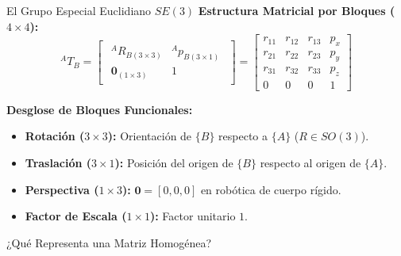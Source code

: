\documentclass[aspectratio=169]{beamer}
\begin{document}
\begin{frame}{El Grupo Especial Euclidiano $SE(3)$}
    \textbf{Estructura Matricial por Bloques ($4 \times 4$):}
    \begin{equation*}
        ^{A}T_B = \begin{bmatrix} 
        \begin{array}{c|c} 
        ^{A}R_{B(3\times3)} & ^{A}p_{B(3\times1)} \\ \hline 
        \mathbf{0}_{(1\times3)} & 1 
        \end{array} 
        \end{bmatrix} = \begin{bmatrix} 
        r_{11} & r_{12} & r_{13} & p_x \\ 
        r_{21} & r_{22} & r_{23} & p_y \\ 
        r_{31} & r_{32} & r_{33} & p_z \\ 
        0 & 0 & 0 & 1 
        \end{bmatrix}
    \end{equation*}
    
    \vspace{0.4cm}
    \textbf{Desglose de Bloques Funcionales:}
    \begin{itemize}
        \item \textbf{Rotación ($3 \times 3$):} Orientación de $\{B\}$ respecto a $\{A\}$ ($R \in SO(3)$).
        \item \textbf{Traslación ($3 \times 1$):} Posición del origen de $\{B\}$ respecto al origen de $\{A\}$.
        \item \textbf{Perspectiva ($1 \times 3$):} $\mathbf{0} = [0, 0, 0]$ en robótica de cuerpo rígido.
        \item \textbf{Factor de Escala ($1 \times 1$):} Factor unitario $1$.
    \end{itemize}
\end{frame}

\begin{frame}{¿Qué Representa una Matriz Homogénea?}
    \renewcommand{\arraystretch}{1.5}
\end{frame}
\end{document}
